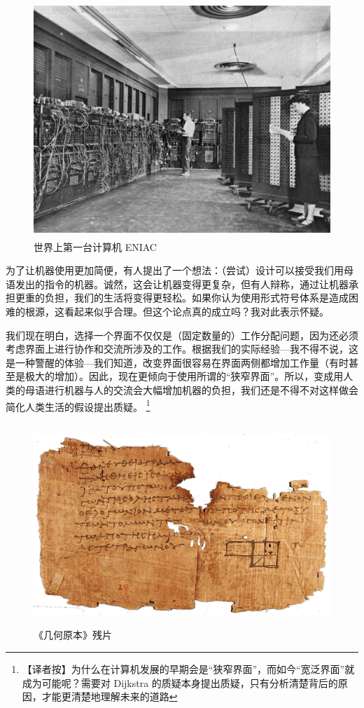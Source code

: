 \documentclass[a4paper,12pt]{article}
\begin{document}
\begin{figure}[ht]
\centering
\includegraphics[height=3.5in]{images/ENIAC.jpeg}
\caption{世界上第一台计算机 ENIAC}
\end{figure}

为了让机器使用更加简便，有人提出了一个想法：（尝试）设计可以接受我们用母语发出的指令的机器。诚然，这会让机器变得更复杂，但有人辩称，通过让机器承担更重的负担，我们的生活将变得更轻松。如果你认为使用形式符号体系是造成困难的根源，这看起来似乎合理。但这个论点真的成立吗？我对此表示怀疑。

我们现在明白，选择一个界面不仅仅是（固定数量的）工作分配问题，因为还必须考虑界面上进行协作和交流所涉及的工作。根据我们的实际经验—我不得不说，这是一种警醒的体验—我们知道，改变界面很容易在界面两侧都增加工作量（有时甚至是极大的增加）。因此，现在更倾向于使用所谓的“狭窄界面”。所以，变成用人类的母语进行机器与人的交流会大幅增加机器的负担，我们还是不得不对这样做会简化人类生活的假设提出质疑。
\footnote{【译者按】为什么在计算机发展的早期会是“狭窄界面”，而如今“宽泛界面”就成为可能呢？需要对 Dijkstra 的质疑本身提出质疑，只有分析清楚背后的原因，才能更清楚地理解未来的道路}

\begin{figure}[ht]
    \centering
    \includegraphics[height=3.0in]{images/elements.jpeg}
    \caption{《几何原本》残片}
\end{figure}
\end{document}
